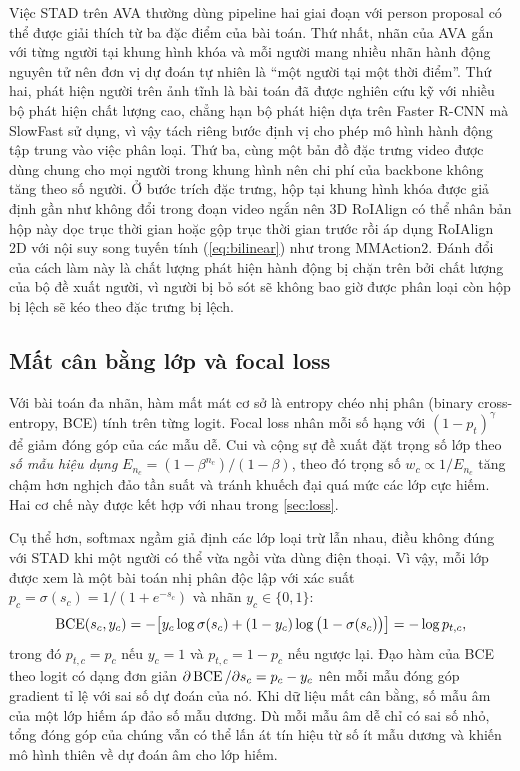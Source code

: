 Việc STAD trên AVA thường dùng pipeline hai giai đoạn với person proposal có thể được giải thích từ ba đặc điểm của bài toán. Thứ nhất, nhãn của AVA gắn với từng người tại khung hình khóa và mỗi người mang nhiều nhãn hành động nguyên tử nên đơn vị dự đoán tự nhiên là ``một người tại một thời điểm''. Thứ hai, phát hiện người trên ảnh tĩnh là bài toán đã được nghiên cứu kỹ với nhiều bộ phát hiện chất lượng cao, chẳng hạn bộ phát hiện dựa trên Faster R-CNN mà SlowFast sử dụng, vì vậy tách riêng bước định vị cho phép mô hình hành động tập trung vào việc phân loại. Thứ ba, cùng một bản đồ đặc trưng video được dùng chung cho mọi người trong khung hình nên chi phí của backbone không tăng theo số người. Ở bước trích đặc trưng, hộp tại khung hình khóa được giả định gần như không đổi trong đoạn video ngắn nên 3D RoIAlign có thể nhân bản hộp này dọc trục thời gian hoặc gộp trục thời gian trước rồi áp dụng RoIAlign 2D với nội suy song tuyến tính (\cref{eq:bilinear}) như trong MMAction2. Đánh đổi của cách làm này là chất lượng phát hiện hành động bị chặn trên bởi chất lượng của bộ đề xuất người, vì người bị bỏ sót sẽ không bao giờ được phân loại còn hộp bị lệch sẽ kéo theo đặc trưng bị lệch.

\subsection{Mất cân bằng lớp và focal loss}
\label{sec:imbalance}

Với bài toán đa nhãn, hàm mất mát cơ sở là entropy chéo nhị phân (binary cross-entropy, BCE) tính trên từng logit. Focal loss \cite{lin2017focal} nhân mỗi số hạng với $(1 - p_t)^{\gamma}$ để giảm đóng góp của các mẫu dễ. Cui và cộng sự \cite{cui2019classbalanced} đề xuất đặt trọng số lớp theo \emph{số mẫu hiệu dụng} $E_{n_c} = (1 - \beta^{n_c})/(1 - \beta)$, theo đó trọng số $w_c \propto 1/E_{n_c}$ tăng chậm hơn nghịch đảo tần suất và tránh khuếch đại quá mức các lớp cực hiếm. Hai cơ chế này được kết hợp với nhau trong \cref{sec:loss}.

Cụ thể hơn, softmax ngầm giả định các lớp loại trừ lẫn nhau, điều không đúng với STAD khi một người có thể vừa ngồi vừa dùng điện thoại. Vì vậy, mỗi lớp được xem là một bài toán nhị phân độc lập với xác suất $p_c = \sigma(s_c) = 1/(1 + e^{-s_c})$ và nhãn $y_c \in \{0, 1\}$:
\begin{equation}
\operatorname{BCE}(s_c, y_c) = -\big[y_c \log \sigma(s_c) + (1 - y_c)\log\big(1 - \sigma(s_c)\big)\big] = -\log p_{t,c},
\label{eq:bce-binary}
\end{equation}
trong đó $p_{t,c} = p_c$ nếu $y_c = 1$ và $p_{t,c} = 1 - p_c$ nếu ngược lại. Đạo hàm của BCE theo logit có dạng đơn giản $\partial \operatorname{BCE} / \partial s_c = p_c - y_c$ nên mỗi mẫu đóng góp gradient tỉ lệ với sai số dự đoán của nó. Khi dữ liệu mất cân bằng, số mẫu âm của một lớp hiếm áp đảo số mẫu dương. Dù mỗi mẫu âm dễ chỉ có sai số nhỏ, tổng đóng góp của chúng vẫn có thể lấn át tín hiệu từ số ít mẫu dương và khiến mô hình thiên về dự đoán âm cho lớp hiếm.

